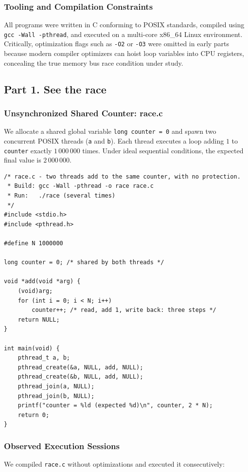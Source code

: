 \documentclass{labreport}
\begin{document}
\subsubsection*{Tooling and Compilation Constraints}
All programs were written in C conforming to POSIX standards, compiled using \texttt{gcc -Wall -pthread}, and executed on a multi-core x86\_64 Linux environment. Critically, optimization flags such as \texttt{-O2} or \texttt{-O3} were omitted in early parts because modern compiler optimizers can hoist loop variables into CPU registers, concealing the true memory bus race condition under study.

\subsection{Part 1. See the race}

\subsubsection{Unsynchronized Shared Counter: race.c}
We allocate a shared global variable \texttt{long counter = 0} and spawn two concurrent POSIX threads (\texttt{a} and \texttt{b}). Each thread executes a loop adding $1$ to \texttt{counter} exactly $1\,000\,000$ times. Under ideal sequential conditions, the expected final value is $2\,000\,000$.

\begin{lstlisting}[style=c]
/* race.c - two threads add to the same counter, with no protection.
 * Build: gcc -Wall -pthread -o race race.c
 * Run:   ./race (several times)
 */
#include <stdio.h>
#include <pthread.h>

#define N 1000000

long counter = 0; /* shared by both threads */

void *add(void *arg) {
    (void)arg;
    for (int i = 0; i < N; i++)
        counter++; /* read, add 1, write back: three steps */
    return NULL;
}

int main(void) {
    pthread_t a, b;
    pthread_create(&a, NULL, add, NULL);
    pthread_create(&b, NULL, add, NULL);
    pthread_join(a, NULL);
    pthread_join(b, NULL);
    printf("counter = %ld (expected %d)\n", counter, 2 * N);
    return 0;
}
\end{lstlisting}

\subsubsection{Observed Execution Sessions}
We compiled \texttt{race.c} without optimizations and executed it consecutively:
\end{document}
